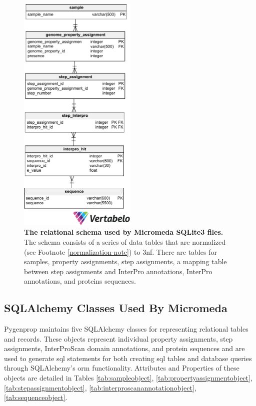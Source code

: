\begin{figure}[!ht]
  \centering
	\includegraphics[width=0.50\textwidth]{media/micromeda_schema.pdf}
	 \caption[The relational schema used by Micromeda SQLite3 files.]{\textbf{The 
relational schema used by Micromeda SQLite3 files.} The schema consists of a 
series of data tables that are normalized (see Footnote 
\ref{normalization-note}) to \gls{3nf}. There are tables for samples, property 
assignments, step assignments, a mapping table between step assignments and 
InterPro annotations, InterPro annotations, and proteins sequences.}
	 \label{fig:micromedaschema}
\end{figure}

\subsection{SQLAlchemy Classes Used By Micromeda} \label{sqlalchemy-classes}

Pygenprop maintains five SQLAlchemy classes for representing relational tables 
and records. These objects represent individual property assignments, step 
assignments, InterProScan domain annotations, and protein sequences and are 
used to generate \gls{sql} statements for both creating \gls{sql} tables and 
database queries through SQLAlchemy's \gls{orm} functionality. Attributes and 
Properties of these objects are detailed in Tables \ref{tab:sampleobject}, 
\ref{tab:propertyassignmentobject}, \ref{tab:stepassignmentobject}, 
\ref{tab:interproscanannotationobject}, \ref{tab:sequenceobject}.

